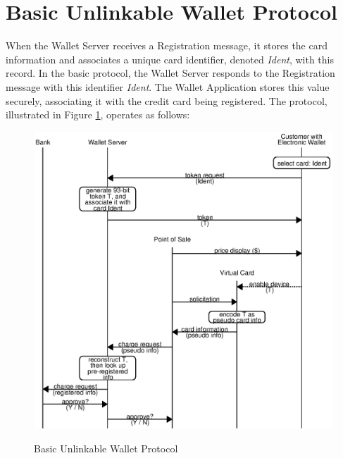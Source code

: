 \section{Basic Unlinkable Wallet Protocol}
\label{sec:unlinkable-design-1}

When the Wallet Server receives a Registration message,
    it stores the card information and associates a unique card identifier, denoted \emph{Ident}, with this record.
In the basic protocol, the Wallet Server responds to the Registration message with this identifier \emph{Ident}.
The Wallet Application stores this value securely, associating it with the credit card being registered.
The protocol, illustrated in Figure \ref{fig:unlinkable-1}, operates as follows:

\begin{figure}[h!]
  \caption{Basic Unlinkable Wallet Protocol}
  \centering
    \includegraphics{img/unlinkable-1.eps}
  \label{fig:unlinkable-1}
\end{figure}

